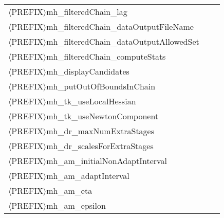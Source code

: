 \begin{table}[htpb]
\begin{center}
\begin{tabular}{l|c|c}
$\langle$PREFIX$\rangle$mh\_filteredChain\_lag                  &         &             \\

$\langle$PREFIX$\rangle$mh\_filteredChain\_dataOutputFileName   &         &             \\

$\langle$PREFIX$\rangle$mh\_filteredChain\_dataOutputAllowedSet &         &             \\

$\langle$PREFIX$\rangle$mh\_filteredChain\_computeStats         &         &             \\

$\langle$PREFIX$\rangle$mh\_displayCandidates                   &         &             \\

$\langle$PREFIX$\rangle$mh\_putOutOfBoundsInChain               &         &             \\

$\langle$PREFIX$\rangle$mh\_tk\_useLocalHessian                 &         &             \\

$\langle$PREFIX$\rangle$mh\_tk\_useNewtonComponent              &         &             \\

$\langle$PREFIX$\rangle$mh\_dr\_maxNumExtraStages               &         &             \\

$\langle$PREFIX$\rangle$mh\_dr\_scalesForExtraStages            &         &             \\

$\langle$PREFIX$\rangle$mh\_am\_initialNonAdaptInterval         &         &             \\

$\langle$PREFIX$\rangle$mh\_am\_adaptInterval                   &         &             \\

$\langle$PREFIX$\rangle$mh\_am\_eta                             &         &             \\

$\langle$PREFIX$\rangle$mh\_am\_epsilon                         &         &             \\
\bottomrule
\end{tabular}
\end{center}
\label{tab-metropolis-hastings-options}
\end{table}

